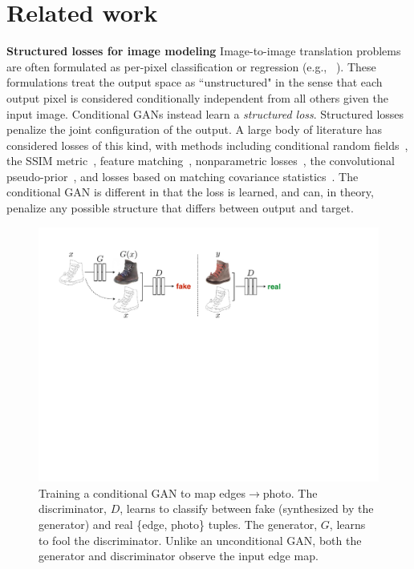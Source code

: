\documentclass[10pt,twocolumn,letterpaper]{article}
\begin{document}
\section{Related work}

{\bf Structured losses for image modeling} Image-to-image translation problems are often formulated as per-pixel classification or regression (e.g., ~\cite{long2015fully,xie2015holistically,iizuka2016let,larsson2016learning,zhang2016colorful}). These formulations treat the output space as ``unstructured" in the sense that each output pixel is considered conditionally independent from all others given the input image. Conditional GANs instead learn a \emph{structured loss}. Structured losses penalize the joint configuration of the output. A large body of literature has considered losses of this kind, with methods including conditional random fields~\cite{chen14semantic}, the SSIM metric~\cite{wang2004image}, feature matching~\cite{dosovitskiy2016generating}, nonparametric losses~\cite{li2016combining}, the convolutional pseudo-prior~\cite{xie2015convolutional}, and losses based on matching covariance statistics~\cite{johnson2016perceptual}. The conditional GAN is different in that the loss is learned, and can, in theory, penalize any possible structure that differs between output and target.

\begin{figure}[t]
 \centering
 \includegraphics[width=1.0\hsize]{figs/cGAN_method_v3.pdf}
 \vspace{-0.2in}
  \caption{Training a conditional GAN to map edges$\rightarrow$photo. The discriminator, $D$, learns to classify between fake (synthesized by the generator) and real \{edge, photo\} tuples. The generator, $G$, learns to fool the discriminator. Unlike an unconditional GAN, both the generator and discriminator observe the input edge map.}
 \label{cGAN_method}
 \vspace{-0.2in}
\end{figure}
\end{document}
